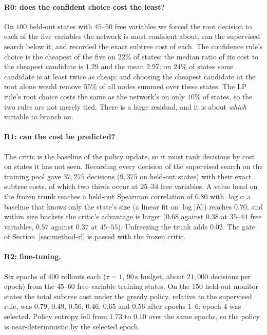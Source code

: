 \documentclass[final,5p,times,twocolumn]{elsarticle}
\begin{document}
\paragraph{R0: does the confident choice cost the least?} On $100$ held-out states with $45$--$50$ free variables we forced the root decision to each of the five variables the network is most confident about, ran the supervised search below it, and recorded the exact subtree cost of each. The confidence rule's choice is the cheapest of the five on $22\%$ of states; the median ratio of its cost to the cheapest candidate is $1.29$ and the mean $2.97$; on $24\%$ of states some candidate is at least twice as cheap; and choosing the cheapest candidate at the root alone would remove $55\%$ of all nodes summed over these states. The LP rule's root choice costs the same as the network's on only $10\%$ of states, so the two rules are not merely tied. There is a large residual, and it is about \emph{which} variable to branch on.

\paragraph{R1: can the cost be predicted?} The critic is the baseline of the policy update, so it must rank decisions by cost on states it has not seen. Recording every decision of the supervised search on the training pool gave $37{,}275$ decisions ($9{,}375$ on held-out states) with their exact subtree costs, of which two thirds occur at $25$--$34$ free variables. A value head on the frozen trunk reaches a held-out Spearman correlation of $0.80$ with $\log c$; a baseline that knows only the state's size (a linear fit on $\log|K|$) reaches $0.70$, and within size buckets the critic's advantage is larger ($0.68$ against $0.38$ at $35$--$44$ free variables, $0.57$ against $0.37$ at $45$--$55$). Unfreezing the trunk adds $0.02$. The gate of Section~\ref{sec:method-rl} is passed with the frozen critic.

\paragraph{R2: fine-tuning.} Six epochs of $400$ rollouts each ($\tau=1$, $90$\,s budget, about $21{,}000$ decisions per epoch) from the $45$--$60$ free-variable training states. On the $150$ held-out monitor states the total subtree cost under the greedy policy, relative to the supervised rule, was $0.79$, $0.49$, $0.56$, $0.46$, $0.65$ and $0.56$ after epochs $1$--$6$; epoch $4$ was selected. Policy entropy fell from $1.73$ to $0.10$ over the same epochs, so the policy is near-deterministic by the selected epoch.
\end{document}
